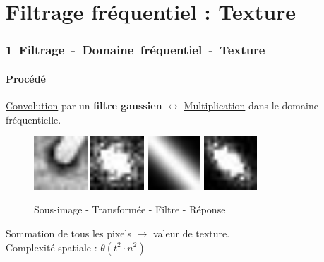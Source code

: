 \documentclass[french]{beamer}
\begin{document}
\section{Filtrage fréquentiel : Texture}

\begin{frame}
	\frametitle{\mbox{1 Filtrage - Domaine fréquentiel - Texture}}
	\framesubtitle{Procédé}
	\underline{Convolution} par un \textbf{filtre gaussien} $\longleftrightarrow$ \underline{Multiplication} dans le domaine fréquentielle.
	\begin{figure}
		\includegraphics[width=2cm]{images/roller_subim.jpg} \; \includegraphics[width=2cm]{images/roller_subimfft.jpg} \;
		\includegraphics[width=2cm]{images/roller_subimf.jpg} \; \includegraphics[width=2cm]{images/roller_subimresp.jpg}\\
		\caption{Sous-image \; - \; Transformée \; - \; Filtre \; - \; Réponse}
	\end{figure}
	\bigskip
	Sommation de tous les pixels $\longrightarrow$ valeur de texture.\\
	\medskip
	Complexité spatiale : $\theta(t^2 \cdot n^2)$
\end{frame}
\end{document}
